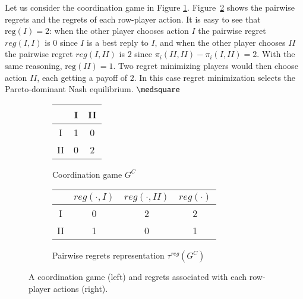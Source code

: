 \documentclass[fleqn,reqno,11pt]{article}
\begin{document}
\begin{example}
  Let us consider the coordination game in Figure \ref{coordgame1}. Figure~\ref{coordgame1reg}
  shows the pairwise regrets and the regrets of each row-player action. It is easy to see that
  $\text{reg}(I)=2$: when the other player chooses action $I$ the pairwise regret $reg(I,I)$ is
  $0$ since $I$ is a best reply to $I$, and when the other player chooses $II$ the pairwise
  regret $reg(I, II)$ is $2$ since $\pi_i(II,II)-\pi_i(I,II)=2$. With the same reasoning,
  $\text{reg}(II)=1$. Two regret minimizing players would then choose action $II$, each getting
  a payoff of $2$. In this case regret minimization selects the Pareto-dominant Nash
  equilibrium. $ \medsquare $

\begin{figure}

  \begin{subfigure}[b]{0.3\textwidth}
    \centering
    \begin{tabular}{ccc}
      \toprule
      & I & II \\
      \midrule
      I & 1 & 0 \\
      II & 0 & 2\\
      \bottomrule
    \end{tabular}
    \caption{Coordination game $G^C$}
    \label{coordgame1}
  \end{subfigure}
  \hspace{1cm}
  \begin{subfigure}[b]{0.5\textwidth}
    \centering
    \begin{tabular}{cccc}
      \toprule
      & $reg( \cdot, I)$ & $reg(\cdot, II)$ & $reg(\cdot)$ \\
      \midrule
      I  & 0 & 2 & 2 \\ 
      II & 1 & 0 & 1\\
      \bottomrule
    \end{tabular}
    \caption{Pairwise regrets representation $\tau^{reg}(G^C)$}
    \label{coordgame1reg}
  \end{subfigure}
  \caption{A coordination game (left) and regrets associated with each row-player actions (right).}
    \label{coordgame1mainFig}
\end{figure}



\end{example}
\end{document}
